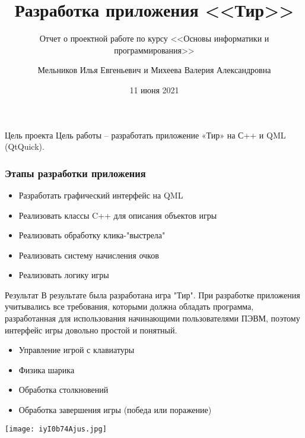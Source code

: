 \documentclass[9pt]{beamer}
\title{Разработка приложения <<Тир>>}
\subtitle{Отчет о проектной работе по курсу <<Основы информатики и программирования>>}
\author{Мельников Илья Евгеньевич и Михеева Валерия Александровна}
\date{11 июня 2021}
\begin{document}
\maketitle

\begin{frame}[fragile]{Цель проекта}
    Цель работы -- разработать приложение «Тир» на С++ и QML (QtQuick).
\end{frame}

\begin{frame}
    \frametitle{Этапы разработки приложения}
    \begin{itemize}
        \item Разработать графический интерфейс на QML
        \item Реализовать классы C++ для описания объектов игры
        \item Реализовать обработку клика-"выстрела"
        \item Реализовать систему начисления очков
        \item Реализовать логику игры
    \end{itemize}
\end{frame}

\begin{frame}[fragile]{Результат}
    В результате была разработана игра "Тир". При разработке приложения учитывались все требования, которыми должна обладать программа, разработанная для использования начинающими пользователями ПЭВМ, поэтому интерфейс игры довольно простой и понятный.
    \begin{itemize}
        \item Управление игрой с клавиатуры
        \item Физика шарика
        \item Обработка столкновений
        \item Обработка завершения игры (победа или поражение)
    \end{itemize}

    \begin{center}
        \texttt{[image: iyI0b74Ajus.jpg]}
    \end{center}

\end{frame}
\end{document}
